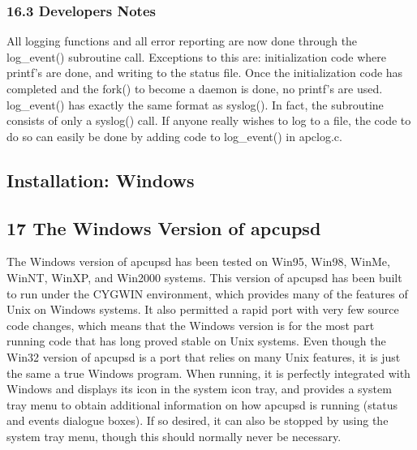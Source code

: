 \subsubsection*{16.3 Developers Notes}

\label{index-Developers-Notes-169}
All logging functions and all error reporting are now done through the
log\_event() subroutine call. Exceptions to this are: initialization code
where printf's are done, and writing to the status file. Once the
initialization code has completed and the fork() to become a daemon is done,
no printf's are used. log\_event() has exactly the same format as syslog(). In
fact, the subroutine consists of only a syslog() call. If anyone really wishes
to log to a file, the code to do so can easily be done by adding code to
log\_event() in apclog.c. 

\label{Installation-on-Windows}

\subsection*{Installation: Windows}

\label{index-Installation_002c-Windows-170}
\label{index-Windows_002c-Installation-171}

\label{The-Windows-Version-of-apcupsd}

\subsection*{17 The Windows Version of apcupsd}

The Windows version of apcupsd has been tested on Win95, Win98, WinMe, WinNT,
WinXP, and Win2000 systems. This version of apcupsd has been built to run
under the CYGWIN environment, which provides many of the features of Unix on
Windows systems. It also permitted a rapid port with very few source code
changes, which means that the Windows version is for the most part running
code that has long proved stable on Unix systems. Even though the Win32
version of apcupsd is a port that relies on many Unix features, it is just the
same a true Windows program. When running, it is perfectly integrated with
Windows and displays its icon in the system icon tray, and provides a system
tray menu to obtain additional information on how apcupsd is running (status
and events dialogue boxes). If so desired, it can also be stopped by using the
system tray menu, though this should normally never be necessary.  

